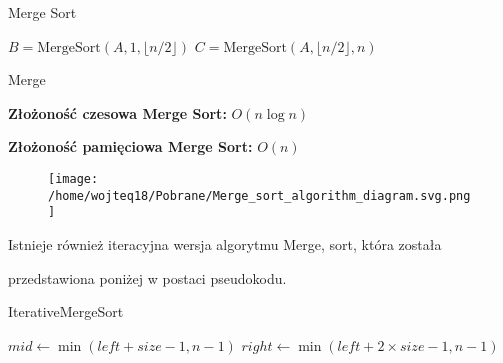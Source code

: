 \documentclass{article}
\begin{document}
\begin{algorithm}[H]
    \caption{Merge Sort}\label{alg:merge_sort}
    \begin{algorithmic}[1]
            \State {}
        \Else
            \State $B = \text{MergeSort}(A, 1, \lfloor n/2 \rfloor)$
            \State $C = \text{MergeSort}(A, \lfloor n/2 \rfloor, n)$
            \State {}
        \EndIf
    \EndProcedure
    \end{algorithmic}    
\end{algorithm}
\begin{algorithm}[H]
    \caption{Merge}\label{alg:merge}
    \begin{algorithmic}[1]
            \State {}
            \State {}
            \State {}   
        \Else
            \State {}
        \EndIf
    \EndProcedure
    \end{algorithmic}       
\end{algorithm}
\vspace{1\baselineskip}
\textbf{Złożoność czesowa Merge Sort:} $O(n \log n)$ \par
\textbf{Złożoność pamięciowa Merge Sort:} $O(n)$
\vspace{2\baselineskip}
\begin{figure}[H]
    \centering
    \texttt{[image: /home/wojteq18/Pobrane/Merge\_sort\_algorithm\_diagram.svg.png]}
    \label{fig:example_image}
\end{figure}
\vspace{2\baselineskip} \par
Istnieje również iteracyjna wersja algorytmu Merge, sort, która została \par
przedstawiona poniżej w postaci pseudokodu.
\begin{algorithm}[H]
    \caption{IterativeMergeSort}\label{alg:iterative_merge}
    \begin{algorithmic}[1]
                    \State $mid \gets \min(left + size - 1, n - 1)$
                    \State $right \gets \min(left + 2 \times size - 1, n - 1)$
                    \State {}
                \EndFor
            \EndFor
        \EndProcedure
    \end{algorithmic}
\end{algorithm}
\end{document}
